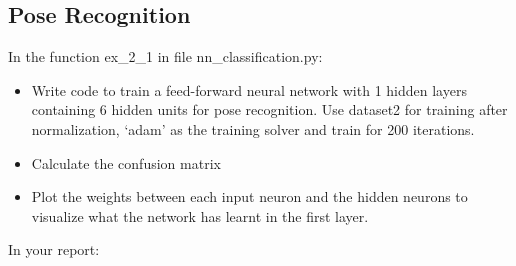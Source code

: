 \documentclass[a4paper]{article}
\begin{document}
\subsection{Pose Recognition}
In the function ex\_2\_1 in file nn\_classification.py:
\begin{itemize}
	\item Write code to train a feed-forward neural network with 1 hidden layers containing 6 hidden units for pose recognition. Use dataset2 for training after normalization, ‘adam’ as the training solver and train for 200 iterations.
    \item Calculate the confusion matrix
    \item Plot the weights between each input neuron and the hidden neurons to visualize what the network has learnt in the first layer.
\end{itemize}
In your report:
\end{document}
